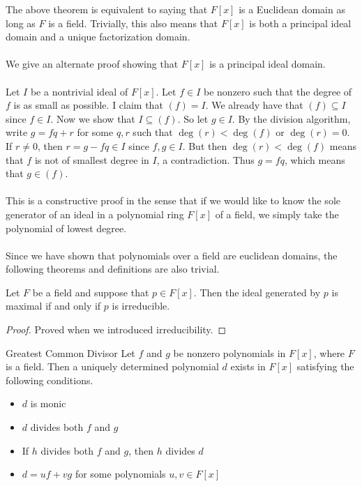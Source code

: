\documentclass[a4paper]{article}
\begin{document}
The above theorem is equivalent to saying that $F[x]$ is a Euclidean domain as long as $F$ is a field. Trivially, this also means that $F[x]$ is both a principal ideal domain and a unique factorization domain. \\~\\
We give an alternate proof showing that $F[x]$ is a principal ideal domain. \\~\\
Let $I$ be a nontrivial ideal of $F[x]$. Let $f\in I$ be nonzero such that the degree of $f$ is as small as possible. I claim that $(f)=I$. We already have that $(f)\subseteq I$ since $f\in I$. Now we show that $I\subseteq(f)$. So let $g\in I$. By the division algorithm, write $g=fq+r$ for some $q,r$ such that $\deg(r)<\deg(f)$ or $\deg(r)=0$. If $r\neq 0$, then $r=g-fq\in I$ since $f,g\in I$. But then $\deg(r)<\deg(f)$ means that $f$ is not of smallest degree in $I$, a contradiction. Thus $g=fq$, which means that $g\in(f)$. \\~\\
This is a constructive proof in the sense that if we would like to know the sole generator of an ideal in a polynomial ring $F[x]$ of a field, we simply take the polynomial of lowest degree. \\~\\

Since we have shown that polynomials over a field are euclidean domains, the following theorems and definitions are also trivial. 

\begin{lmm}{}{} Let $F$ be a field and suppose that $p\in F[x]$. Then the ideal generated by $p$ is maximal if and only if $p$ is irreducible. \tcbline
\begin{proof}
Proved when we introduced irreducibility. 
\end{proof}
\end{lmm}

\begin{prp}{Greatest Common Divisor}{} Let $f$ and $g$ be nonzero polynomials in $F[x]$, where $F$ is a field. Then a uniquely determined polynomial $d$ exists in $F[x]$ satisfying the following conditions. 
\begin{itemize}
\item $d$ is monic
\item $d$ divides both $f$ and $g$
\item If $h$ divides both $f$ and $g$, then $h$ divides $d$
\item $d=uf+vg$ for some polynomials $u,v\in F[x]$
\end{itemize}
\end{prp}
\end{document}
